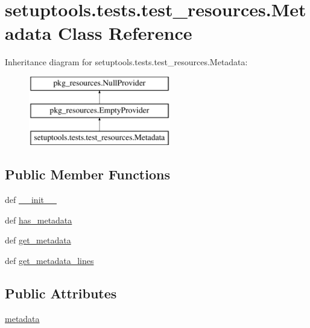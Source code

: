 \hypertarget{classsetuptools_1_1tests_1_1test__resources_1_1Metadata}{}\section{setuptools.\+tests.\+test\+\_\+resources.\+Metadata Class Reference}
\label{classsetuptools_1_1tests_1_1test__resources_1_1Metadata}
Inheritance diagram for setuptools.\+tests.\+test\+\_\+resources.\+Metadata\+:\begin{figure}[H]
\begin{center}
\leavevmode
\includegraphics[height=3.000000cm]{classsetuptools_1_1tests_1_1test__resources_1_1Metadata}
\end{center}
\end{figure}
\subsection*{Public Member Functions}
\begin{DoxyCompactItemize}
\item 
def \hyperlink{classsetuptools_1_1tests_1_1test__resources_1_1Metadata_ae1c3533452f781029054ff976aa3e3a2}{\+\_\+\+\_\+init\+\_\+\+\_\+}
\item 
def \hyperlink{classsetuptools_1_1tests_1_1test__resources_1_1Metadata_aecc6beb3ec8018c884635d5141987d9c}{has\+\_\+metadata}
\item 
def \hyperlink{classsetuptools_1_1tests_1_1test__resources_1_1Metadata_ae48016c0754688e08389c6f9b176ffb5}{get\+\_\+metadata}
\item 
def \hyperlink{classsetuptools_1_1tests_1_1test__resources_1_1Metadata_a3f06a32bc19a52b62d6bbcc141edd0b0}{get\+\_\+metadata\+\_\+lines}
\end{DoxyCompactItemize}
\subsection*{Public Attributes}
\begin{DoxyCompactItemize}
\item 
\hyperlink{classsetuptools_1_1tests_1_1test__resources_1_1Metadata_a56f2ca4d2bfdc6cb8a7fe20514fe2402}{metadata}
\end{DoxyCompactItemize}
